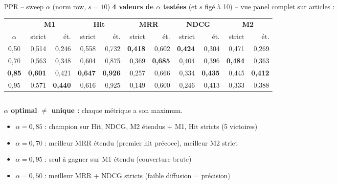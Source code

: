 \documentclass[aspectratio=169,10pt]{beamer}
\newcommand{\keybox}[1]{%
  \begin{center}
  \colorbox{accentsoft}{\parbox{0.92\linewidth}{\centering #1}}
  \end{center}}
\begin{document}
\begin{frame}{PPR -- sweep $\alpha$ (norm row, $s{=}10$)}
  \scriptsize
  \textbf{4 valeurs de $\alpha$ testées} (et $s$ figé à 10) -- vue panel complet sur articles :

  \vspace{0.3em}
  \renewcommand{\arraystretch}{1.15}
  \setlength{\tabcolsep}{4pt}
  \begin{center}
  \begin{tabular}{@{}c | r r | r r | r r | r r | r r@{}}
    \toprule
     & \multicolumn{2}{c|}{\textbf{M1}} & \multicolumn{2}{c|}{\textbf{Hit}}
     & \multicolumn{2}{c|}{\textbf{MRR}} & \multicolumn{2}{c|}{\textbf{NDCG}}
     & \multicolumn{2}{c}{\textbf{M2}} \\
    $\alpha$ & strict & ét. & strict & ét. & strict & ét. & strict & ét. & strict & ét. \\
    \midrule
    0,50 & 0,514 & 0,246 & 0,558 & 0,732 & \textbf{0,418} & 0,602 & \textbf{0,424} & 0,304 & 0,471 & 0,269 \\
    0,70 & 0,563 & 0,348 & 0,604 & 0,875 & 0,369 & \textbf{0,685} & 0,404 & 0,396 & \textbf{0,484} & 0,363 \\
    \rowcolor{green!10}
    \textbf{0,85} & \textbf{0,601} & 0,421 & \textbf{0,647} & \textbf{0,926}
    & 0,257 & 0,666 & 0,334 & \textbf{0,435} & 0,445 & \textbf{0,412} \\
    \rowcolor{accentsoft}
    0,95 & 0,571 & \textbf{0,440} & 0,616 & 0,925
    & 0,149 & 0,600 & 0,246 & 0,413 & 0,333 & 0,388 \\
    \bottomrule
  \end{tabular}
  \end{center}

  \vspace{0.4em}
  \begin{columns}[T]
    \keybox{\scriptsize \textbf{$\alpha$ optimal $\neq$ unique :} chaque métrique a son maximum.
    \begin{itemize}\setlength{\itemsep}{0.05em}
      \item $\alpha=0{,}85$ : champion sur Hit, NDCG, M2 étendus + M1, Hit stricts (5 victoires)
      \item $\alpha=0{,}70$ : meilleur MRR étendu (premier hit précoce), meilleur M2 strict
      \item $\alpha=0{,}95$ : seul à gagner sur M1 étendu (couverture brute)
      \item $\alpha=0{,}50$ : meilleur MRR + NDCG stricts (faible diffusion = précision)
    \end{itemize}}


\end{columns}
\end{frame}
\end{document}
